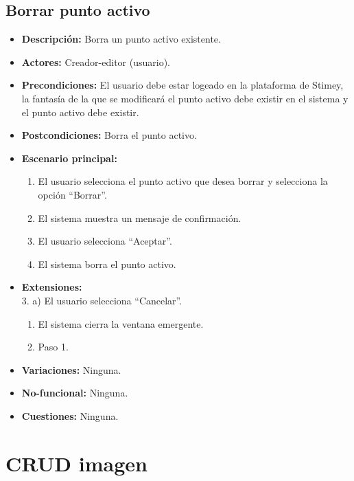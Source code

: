 \documentclass[12pt,letterpaper]{article}
\begin{document}
\subsection{Borrar punto activo}
\begin{itemize}
	\item \textbf{Descripción:} Borra un punto activo existente.
	\item \textbf{Actores:} Creador-editor (usuario).
	\item \textbf{Precondiciones:} El usuario debe estar logeado en la plataforma de Stimey, la fantasía de la que se modificará el punto activo debe existir en el sistema y el punto activo debe existir.
	\item \textbf{Postcondiciones:} Borra el punto activo.
	\item \textbf{Escenario principal:}
	\begin{enumerate}
		\item El usuario selecciona el punto activo que desea borrar y selecciona la opción ``Borrar''.
		\item El sistema muestra un mensaje de confirmación.
		\item El usuario selecciona ``Aceptar''.
		\item El sistema borra el punto activo.
	\end{enumerate}
	\item \textbf{Extensiones:} \\ 3. a) El usuario selecciona ``Cancelar''.
	\begin{enumerate}
		\item El sistema cierra la ventana emergente.
		\item Paso 1.
	\end{enumerate}
	\item \textbf{Variaciones:} Ninguna.
	\item \textbf{No-funcional:} Ninguna.
	\item \textbf{Cuestiones:} Ninguna.
\end{itemize}

\section{CRUD imagen} %
\hypertarget{crearimagen}{}
\end{document}

